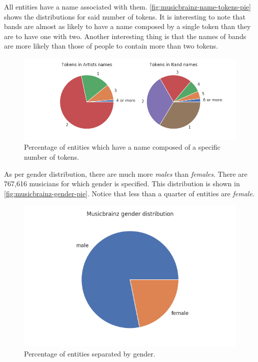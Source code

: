 \documentclass[epsfig,a4paper,11pt,titlepage,twoside,openany]{book}
\begin{document}
All entities have a name associated with them. \autoref{fig:musicbrainz-name-tokens-pie} shows the distributions for said number of tokens. It is interesting to note that bands are almost as likely to have a name composed by a single token than they are to have one with two. Another interesting thing is that the names of bands are more likely than those of people to contain more than two tokens.

\begin{figure}[H]
  \centering \includegraphics[width=\textwidth]{musicbrainz_token_names_entities} 
  \caption{Percentage of entities which have a name composed of a specific number of tokens.}
  \label{fig:musicbrainz-name-tokens-pie}
\end{figure}

As per gender distribution, there are much more \textit{males} than \textit{females}. There are 767,616 musicians for which gender is specified. This distribution is shown in \autoref{fig:musicbrainz-gender-pie}. Notice that less than a quarter of entities are \textit{female}.

\begin{figure}[H]
  \centering \includegraphics[width=.8\textwidth]{musicbrainz_gender_pieplot} 
  \caption{Percentage of entities separated by gender.}
  \label{fig:musicbrainz-gender-pie}
\end{figure}
\end{document}
